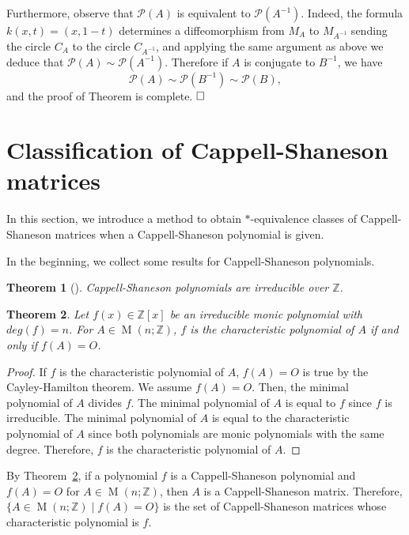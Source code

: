 \documentclass[12pt]{amsart}
\theoremstyle{plain}
\newtheorem{theorem}{Theorem}[section]
\theoremstyle{definition}
\theoremstyle{remark}
\newcommand{\PPPP}{{\mathscr{P}}}
\newcommand{\qs}{\hfill\square}
\renewcommand{\(}{\big(}
\renewcommand{\)}{\big)}
\theoremstyle{plain}
\theoremstyle{definition}
\begin{document}
    Furthermore, observe that $\PPPP(A)$ is equivalent to
    $\PPPP(A^{-1})$. Indeed, the formula
    $k(x,t)=(x,1-t)$
    determines a diffeomorphism from $M_A$ to $M_{A^{-1}}$
    sending the circle $C_A$ to the circle $C_{A^{-1}}$,
    and applying the same argument as above we deduce that
    $\PPPP(A)\sim\PPPP(A^{-1})$. Therefore if $A$ is
    conjugate to $B^{-1}$, we have
    $$\PPPP(A)\sim\PPPP(B^{-1})\sim \PPPP(B),$$
    and the proof of  Theorem is complete. $\qs$





\section{Classification of Cappell-Shaneson matrices}\label{section:classification_cs_matrix}
    In this section, we introduce a method to obtain $*$-equivalence classes of Cappell-Shaneson matrices when a Cappell-Shaneson polynomial is given.

    In the beginning, we collect some results for Cappell-Shaneson polynomials.
    
    \begin{theorem}[{\cite[Theorem 3.2.]{Gu-Jiang}}]\label{theorem:irr}
     Cappell-Shaneson polynomials are irreducible over $\mathbb{Z}$.
    \end{theorem}
    
    \begin{theorem}\label{theorem:irr2}
    Let $f(x) \in \mathbb{Z}[x]$ be an irreducible monic polynomial with $deg(f) =n$. For $A \in \operatorname{M}(n;\mathbb{Z})$, $f$ is the characteristic polynomial of $A$ if and only if $f(A)=O$.
    \end{theorem}
    
    \begin{proof}
        If $f$ is the characteristic polynomial of $A$, $f(A)=O$ is true by the Cayley-Hamilton theorem. We assume $f(A)=O$. Then, the minimal polynomial of $A$ divides $f$. The minimal polynomial of $A$ is equal to $f$ since $f$ is irreducible. The minimal polynomial of $A$ is equal to the characteristic polynomial of $A$ since both polynomials are monic polynomials with the same degree. Therefore, $f$ is the characteristic polynomial of $A$.
    \end{proof}

    By Theorem~\ref{theorem:irr2}, if a polynomial $f$ is a Cappell-Shaneson polynomial and $f(A)=O$ for $A \in \operatorname{M}(n;\mathbb{Z})$, then $A$ is a Cappell-Shaneson matrix. Therefore, $\{A \in \operatorname{M}(n;\mathbb{Z})\mid f(A)=O\}$ is the set of Cappell-Shaneson matrices whose characteristic polynomial is $f$.
\end{document}

